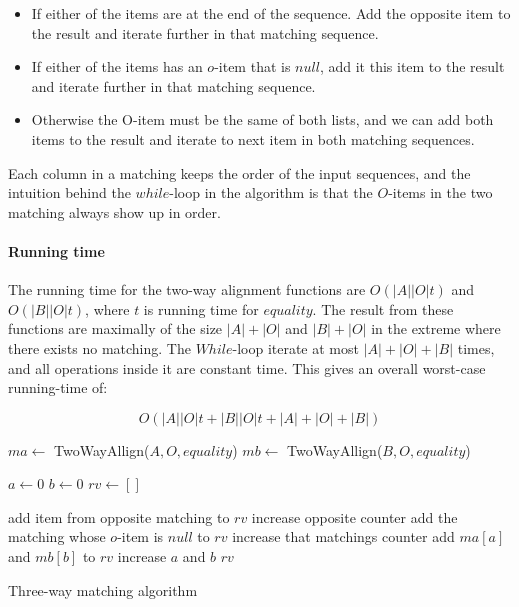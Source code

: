 \documentclass[11pt]{article}
\begin{document}
\begin{itemize}
	\item If either of the items are at the end of the sequence. Add the opposite item to the result and iterate further in that matching sequence.
	\item If either of the items has an $o$-item that is $null$, add it this item to the result and iterate further in that matching sequence.
	\item Otherwise the O-item must be the same of both lists, and we can add both items to the result and iterate to next item in both matching sequences.
\end{itemize}

Each column in a matching keeps the order of the input sequences, and the intuition behind the $while$-loop in the algorithm is that the $O$-items in the two matching always show up in order.

\paragraph{Running time} The running time for the two-way alignment functions are $O(|A||O|t)$ and $O(|B||O|t)$, where $t$ is running time for $equality$. The result from these functions are maximally of the size $|A|+|O|$ and $|B|+|O|$ in the extreme where there exists no matching. The $While$-loop iterate at most $|A|+|O|+|B|$ times, and all operations inside it are constant time. This gives an overall worst-case running-time of:

\begin{equation}
	O(|A||O| t + |B||O| t + |A|+|O|+|B| ) \nonumber
\end{equation}  

\begin{algorithm}
\begin{algorithmic}
	\State $ma\gets$ TwoWayAllign($A, O, equality$)
	\State $mb\gets$ TwoWayAllign($B, O, equality$)
	
	\State $a \gets 0$
	\State $b \gets 0$
	\State $rv \gets []$
	
			\State add item from opposite matching to $rv$
			\State increase opposite counter
			\State add the matching whose $o$-item is $null$ to $rv$
			\State increase that matchings counter
		\Else
			\State add $ma[a]$ and $mb[b]$ to $rv$
			\State increase $a$ and $b$
		\EndIf
	\EndWhile
	\State \Return $rv$
	
\EndFunction
\end{algorithmic}
\caption{Three-way matching algorithm}
  \label{ThreeWayMatchingAlgorithm}
\end{algorithm}
\end{document}

